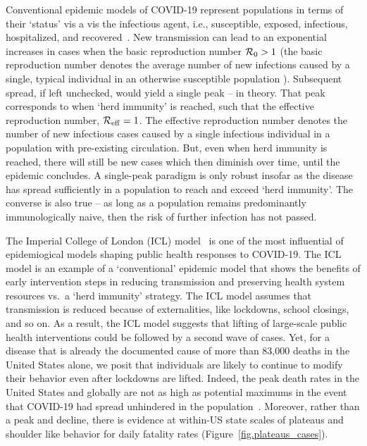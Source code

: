 Conventional epidemic
models of COVID-19 represent populations in terms of their `status' vis
a vis the infectious agent, i.e., susceptible, exposed, infectious,
hospitalized, and recovered~\citep{ferguson2020report,kucharski2020early,kissler_medrxiv2020,park_medrxiv2020,kraemer_2020sci,li_science2020,wu_2020natmed}.
New transmission can lead to an exponential increases in cases 
when the basic reproduction number ${\cal{R}}_0>1$ (the
basic reproduction number denotes the average number of new
infections caused by a single, typical individual in an otherwise
susceptible population \citep{anderson1991infectious}).  Subsequent
spread, if left unchecked, would yield a single peak -- in theory. That 
peak corresponds to when `herd immunity' is reached, such
that the effective reproduction number, ${\cal{R}}_{\mathrm{eff}}=1$.
The effective reproduction number denotes the number of new
infectious cases caused by a single infectious individual
in a population with pre-existing circulation.
But, even when herd immunity is reached, there will still be new cases 
which then diminish over time, until the epidemic concludes.  
A single-peak paradigm is
only robust insofar as the disease has spread
sufficiently in a population to reach and exceed `herd immunity'.
The converse
is also true  -- as long as 
a population remains predominantly immunologically
naive, then the risk of further infection has not passed. 

The Imperial College of London (ICL) model~\citep{ferguson2020report} is
one of the most influential of 
epidemiogical models shaping public health responses to COVID-19. The ICL model is an
example of a `conventional' epidemic model
that shows the benefits of  early intervention steps in reducing
transmission and preserving health system resources vs.~a `herd immunity' strategy.  
The ICL model assumes that
transmission is reduced because of externalities, like lockdowns,
school closings, and so on.  
As a result, the ICL model suggests that lifting of large-scale
public health interventions could be followed by a second wave of cases.
Yet, for a disease
that is already the documented cause of more than 83,000 deaths
in the United States alone, we posit that individuals
are likely to continue to modify
their behavior even after lockdowns are lifted.  
Indeed, the peak death rates in the United States and globally
are not as high as potential maximums in the event that
COVID-19 had spread unhindered in the population~\citep{ferguson2020report}. 
Moreover, rather than a peak and decline, there is evidence at within-US state scales of plateaus and shoulder like
behavior for daily fatality rates (Figure~\ref{fig.plateaus_cases}).   

